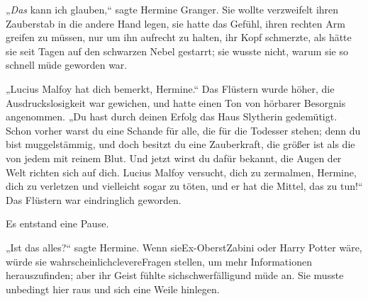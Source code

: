 „\emph{Das} kann ich glauben,“ sagte Hermine Granger. Sie wollte verzweifelt ihren Zauberstab in die andere Hand legen, sie hatte das Gefühl, ihren rechten Arm greifen zu müssen, nur um ihn aufrecht zu halten, ihr Kopf schmerzte, als hätte sie seit Tagen auf den schwarzen Nebel gestarrt; sie wusste nicht, warum sie so schnell müde geworden war.

„Lucius Malfoy hat dich bemerkt, Hermine.“ Das Flüstern wurde höher, die Ausdruckslosigkeit war gewichen, und hatte einen Ton von hörbarer Besorgnis angenommen. „Du hast durch deinen Erfolg das Haus Slytherin gedemütigt. Schon vorher warst du eine Schande für alle, die für die Todesser stehen; denn du bist muggelstämmig, und doch besitzt du eine Zauberkraft, die größer ist als die von jedem mit reinem Blut. Und jetzt wirst du dafür bekannt, die Augen der Welt richten sich auf dich. Lucius Malfoy versucht, dich zu zermalmen, Hermine, dich zu verletzen und vielleicht sogar zu töten, und er hat die Mittel, das zu tun!“ Das Flüstern war eindringlich geworden.

Es entstand eine Pause.

„Ist das alles?“ sagte Hermine. Wenn sieEx-OberstZabini oder Harry Potter wäre, würde sie wahrscheinlichclevereFragen stellen, um mehr Informationen herauszufinden; aber ihr Geist fühlte sichschwerfälligund müde an. Sie musste unbedingt hier raus und sich eine Weile hinlegen.


